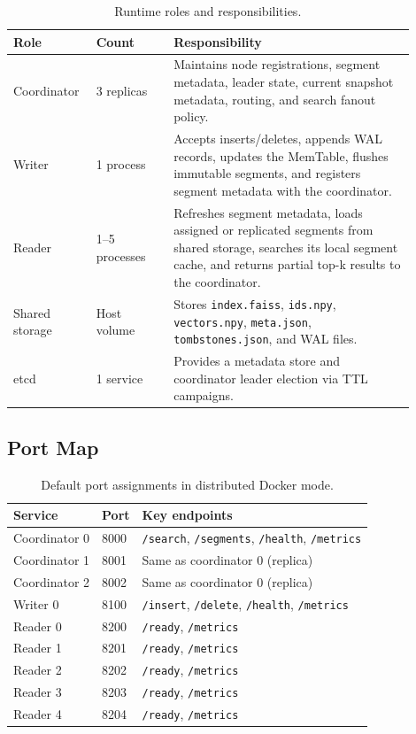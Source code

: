 \documentclass[11pt,a4paper]{article}
\begin{document}
\begin{table}[H]
\centering
\caption{Runtime roles and responsibilities.}
\renewcommand{\arraystretch}{1.2}
\begin{tabular}{p{0.16\linewidth} p{0.18\linewidth} p{0.56\linewidth}}
\toprule
\textbf{Role} & \textbf{Count} & \textbf{Responsibility} \\
\midrule
Coordinator & 3 replicas &
  Maintains node registrations, segment metadata, leader state, current
  snapshot metadata, routing, and search fanout policy. \\
Writer & 1 process &
  Accepts inserts/deletes, appends WAL records, updates the MemTable,
  flushes immutable segments, and registers segment metadata with the
  coordinator. \\
Reader & 1–5 processes &
  Refreshes segment metadata, loads assigned or replicated segments from
  shared storage, searches its local segment cache, and returns partial
  top-k results to the coordinator. \\
Shared storage & Host volume &
  Stores \texttt{index.faiss}, \texttt{ids.npy}, \texttt{vectors.npy},
  \texttt{meta.json}, \texttt{tombstones.json}, and WAL files. \\
etcd & 1 service &
  Provides a metadata store and coordinator leader election via TTL
  campaigns. \\
\bottomrule
\end{tabular}
\end{table}

\subsection{Port Map}

\begin{table}[H]
\centering
\caption{Default port assignments in distributed Docker mode.}
\renewcommand{\arraystretch}{1.15}
\begin{tabular}{lll}
\toprule
\textbf{Service} & \textbf{Port} & \textbf{Key endpoints} \\
\midrule
Coordinator 0 & 8000 & \texttt{/search}, \texttt{/segments}, \texttt{/health}, \texttt{/metrics} \\
Coordinator 1 & 8001 & Same as coordinator 0 (replica) \\
Coordinator 2 & 8002 & Same as coordinator 0 (replica) \\
Writer 0       & 8100 & \texttt{/insert}, \texttt{/delete}, \texttt{/health}, \texttt{/metrics} \\
Reader 0       & 8200 & \texttt{/ready}, \texttt{/metrics} \\
Reader 1       & 8201 & \texttt{/ready}, \texttt{/metrics} \\
Reader 2       & 8202 & \texttt{/ready}, \texttt{/metrics} \\
Reader 3       & 8203 & \texttt{/ready}, \texttt{/metrics} \\
Reader 4       & 8204 & \texttt{/ready}, \texttt{/metrics} \\
\bottomrule
\end{tabular}
\end{table}
\end{document}
